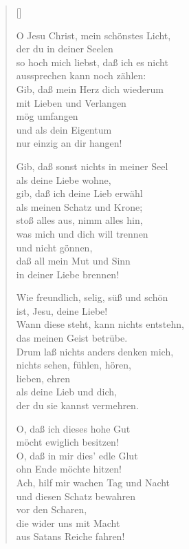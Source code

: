 \begin{multicols}{2}
\settowidth{\versewidth}{Mein Trost, mein Schatz, mein Licht und Heil,}
\begin{verse}[\versewidth]

 O Jesu Christ, mein schönstes Licht,\\
der du in deiner Seelen\\
so hoch mich liebst, daß ich es nicht\\
aussprechen kann noch zählen:\\
Gib, daß mein Herz dich wiederum\\
mit Lieben und Verlangen\\
mög umfangen\\
und als dein Eigentum\\
nur einzig an dir hangen!

 Gib, daß sonst nichts in meiner Seel\\
als deine Liebe wohne,\\
gib, daß ich deine Lieb erwähl\\
als meinen Schatz und Krone;\\
stoß alles aus, nimm alles hin,\\
was mich und dich will trennen\\
und nicht gönnen,\\
daß all mein Mut und Sinn\\
in deiner Liebe brennen!

 Wie freundlich, selig, süß und schön\\
ist, Jesu, deine Liebe!\\
Wann diese steht, kann nichts entstehn,\\
das meinen Geist betrübe.\\
Drum laß nichts anders denken mich,\\
nichts sehen, fühlen, hören,\\
lieben, ehren\\
als deine Lieb und dich,\\
der du sie kannst vermehren.

 O, daß ich dieses hohe Gut\\
möcht ewiglich besitzen!\\
O, daß in mir dies' edle Glut\\
ohn Ende möchte hitzen!\\
Ach, hilf mir wachen Tag und Nacht\\
und diesen Schatz bewahren\\
vor den Scharen,\\
die wider uns mit Macht\\
aus Satans Reiche fahren!


\end{verse}
\end{multicols}
